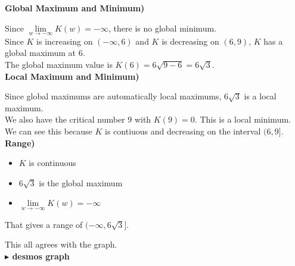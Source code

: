 \documentclass{ximera}
\begin{document}
\begin{example}
\textbf{Global Maximum and Minimum)}



Since $\lim\limits_{w \to -\infty} K(w) = -\infty$, there is no global minimum. \\


Since $K$ is increasing on $(-\infty, 6)$ and $K$ is decreasing on $(6, 9)$, $K$ has a global maximum at $6$.  \\

The global maximum value is $K(6) = 6 \sqrt{9 - 6} = 6 \sqrt{3}$. \\




\textbf{Local Maximum and Minimum)}


Since global maximums are automatically local maximums, $6 \sqrt{3}$ is a local maximum. \\


We also have the critical number $9$ with $K(9) = 0$.  This is a local minimum.  We can see this because $K$ is contiuous and decreasing on the interval $(6, 9]$. \\









\textbf{Range)}

\begin{itemize}
  \item $K$ is continuous
  \item $6 \sqrt{3}$ is the global maximum
  \item $\lim\limits_{w \to -\infty} K(w) = -\infty$
\end{itemize}

That gives a range of $(-\infty, 6 \sqrt{3}]$.




This all agrees with the graph. \\




\textbf{\textcolor{blue!55!black}{$\blacktriangleright$ desmos graph}} 
\begin{center}
\end{center}






\end{example}
\end{document}

